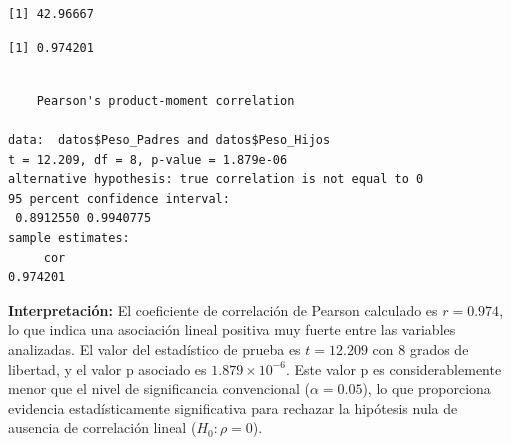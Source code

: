 \documentclass[
  spanish,
  letterpaper,
]{book}
\newenvironment{Shaded}{\begin{snugshade}}{\end{snugshade}}
\newcommand{\AttributeTok}[1]{\textcolor[rgb]{0.40,0.45,0.13}{#1}}
\newcommand{\CommentTok}[1]{\textcolor[rgb]{0.37,0.37,0.37}{#1}}
\newcommand{\FloatTok}[1]{\textcolor[rgb]{0.68,0.00,0.00}{#1}}
\newcommand{\FunctionTok}[1]{\textcolor[rgb]{0.28,0.35,0.67}{#1}}
\newcommand{\NormalTok}[1]{\textcolor[rgb]{0.00,0.23,0.31}{#1}}
\newcommand{\SpecialCharTok}[1]{\textcolor[rgb]{0.37,0.37,0.37}{#1}}
\newcommand{\StringTok}[1]{\textcolor[rgb]{0.13,0.47,0.30}{#1}}
\begin{document}
\begin{Shaded}
\end{Shaded}

\begin{verbatim}
[1] 42.96667
\end{verbatim}

\begin{Shaded}
\end{Shaded}

\begin{verbatim}
[1] 0.974201
\end{verbatim}

\begin{Shaded}
\end{Shaded}

\begin{verbatim}

    Pearson's product-moment correlation

data:  datos$Peso_Padres and datos$Peso_Hijos
t = 12.209, df = 8, p-value = 1.879e-06
alternative hypothesis: true correlation is not equal to 0
95 percent confidence interval:
 0.8912550 0.9940775
sample estimates:
     cor 
0.974201 
\end{verbatim}

\textbf{Interpretación:} El coeficiente de correlación de Pearson
calculado es \(r = 0.974\), lo que indica una asociación lineal positiva
muy fuerte entre las variables analizadas. El valor del estadístico de
prueba es \(t = 12.209\) con \(8\) grados de libertad, y el valor p
asociado es \(1.879 \times 10^{-6}\). Este valor p es considerablemente
menor que el nivel de significancia convencional (\(\alpha = 0.05\)), lo
que proporciona evidencia estadísticamente significativa para rechazar
la hipótesis nula de ausencia de correlación lineal (\(H_0: \rho = 0\)).
\end{document}
